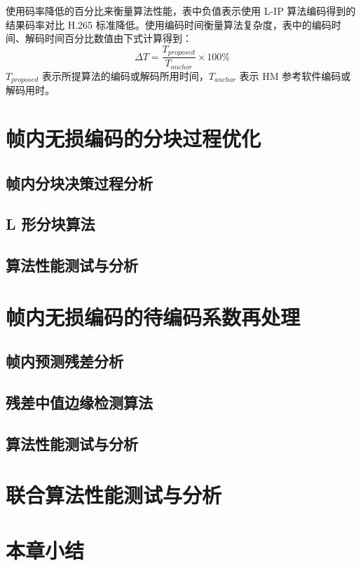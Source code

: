 使用码率降低的百分比来衡量算法性能，表中负值表示使用 L-IP 算法编码得到的结果码率对比 H.265 标准降低。使用编码时间衡量算法复杂度，表中的编码时间、解码时间百分比数值由下式计算得到：
\begin{equation}
    \Delta T=\frac{T_{proposed}}{T_{anchor}}\times 100\%
\end{equation}
$T_{proposed}$ 表示所提算法的编码或解码所用时间，$T_{anchor}$ 表示 HM 参考软件编码或解码用时。


\section{帧内无损编码的分块过程优化}

\subsection{帧内分块决策过程分析}

\subsection{L 形分块算法}

\subsection{算法性能测试与分析}


\section{帧内无损编码的待编码系数再处理}

\subsection{帧内预测残差分析}


\subsection{残差中值边缘检测算法}

\subsection{算法性能测试与分析}


\section{联合算法性能测试与分析}

\section{本章小结}